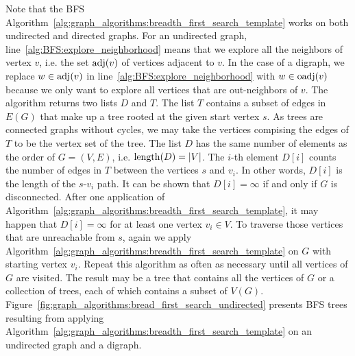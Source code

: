 Note that the BFS
Algorithm~\ref{alg:graph_algorithms:breadth_first_search_template}
works on both undirected and directed graphs. For an undirected graph,
line~\ref{alg:BFS:explore_neighborhood} means that we explore all
the neighbors of vertex $v$, i.e. the set $\operatorname*{adj}(v)$ of vertices
adjacent to $v$. In the case of a digraph, we replace $w \in \operatorname*{adj}(v)$
in line~\ref{alg:BFS:explore_neighborhood} with $w \in \operatorname*{oadj}(v)$
because we only want to explore all vertices that are out-neighbors of
$v$. The algorithm returns two lists $D$ and $T$. The list $T$
contains a subset of edges in $E(G)$ that make up a tree rooted at the
given start vertex $s$. As trees are connected graphs without cycles,
we may take the vertices compising the edges of $T$ to be the vertex
set of the tree. The list $D$ has the same number of elements as the
order of $G = (V, E)$, i.e. $\operatorname*{length}(D) = |V|$. The $i$-th element
$D[i]$ counts the number of edges in $T$ between the vertices $s$ and
$v_i$. In other words, $D[i]$ is the length of the $s$-$v_i$ path. It
can be shown that $D[i] = \infty$ if and only if $G$ is
disconnected. After one application of
Algorithm~\ref{alg:graph_algorithms:breadth_first_search_template}, it
may happen that $D[i] = \infty$ for at least one vertex
$v_i \in V$. To traverse those vertices that are unreachable from $s$,
again we apply
Algorithm~\ref{alg:graph_algorithms:breadth_first_search_template} on
$G$ with starting vertex $v_i$. Repeat this algorithm as often as
necessary until all vertices of $G$ are visited. The result may be a
tree that contains all the vertices of $G$ or a collection of trees,
each of which contains a subset of $V(G)$.
Figure~\ref{fig:graph_algorithms:bread_first_search_undirected}
presents BFS trees resulting from applying
Algorithm~\ref{alg:graph_algorithms:breadth_first_search_template} on
an undirected graph and a digraph.



